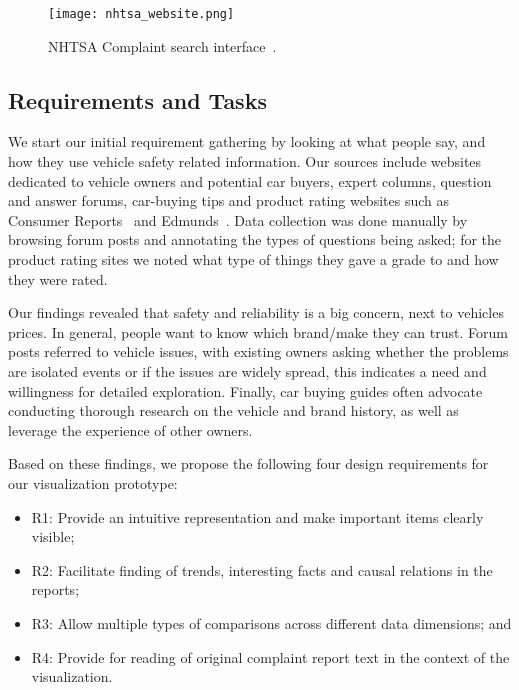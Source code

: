 	\begin{figure}
	   \centering  
	   \texttt{[image: nhtsa\_website.png]}
	   \caption[NHTSA Complaint search interface.]{NHTSA Complaint search
	   interface~\cite{nhtsa}.}
	   \label{figure:nhtsa}
	\end{figure}



\subsection{Requirements and Tasks}

We start our initial requirement gathering by looking at what people say, and
how they use vehicle safety related information. Our sources include websites 
dedicated to vehicle owners and potential car buyers, expert columns, 
question and answer forums, car-buying tips and product rating websites such 
as Consumer Reports~\cite{consumerReports} and Edmunds~\cite{edmunds}. Data
collection was done manually by browsing forum posts and annotating the types of
questions being asked; for the product rating sites we noted what type of things
they gave a grade to and how they were rated.


Our findings revealed that safety and reliability is a big concern, next to
vehicles prices. In general, people want to know which brand/make 
they can trust. Forum posts referred to vehicle issues, with existing owners 
asking whether the problems are isolated events or if the issues are widely
spread, this indicates a need and willingness for detailed exploration. Finally, car buying 
guides often advocate conducting thorough research on the vehicle and brand history, 
as well as leverage the experience of other owners. 
 
Based on these findings, we propose the following four design requirements for
our visualization prototype:
\begin{itemize}[noitemsep]
  \item R1: Provide an intuitive representation and make important items clearly
  visible;
  \item R2: Facilitate finding of trends, interesting facts and causal relations
  in the reports;
  \item R3: Allow multiple types of comparisons across different data
  dimensions; and
  \item R4: Provide for reading of original complaint report text in the context
  of the visualization.
\end{itemize}

